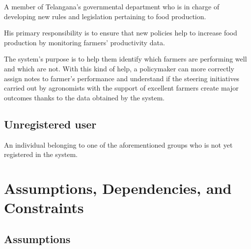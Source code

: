 A member of Telangana's governmental department who is in charge of developing new rules and legislation pertaining to food production.

His primary responsibility is to ensure that new policies help to increase food production by monitoring farmers' productivity data.

The system's purpose is to help them identify which farmers are performing well and which are not. With this kind of help, a policymaker can more correctly assign notes to farmer's performance and understand if the steering initiatives carried out by agronomists with the support of excellent farmers create major outcomes thanks to the data obtained by the system.

\subsection{Unregistered user}

An individual belonging to one of the aforementioned groups who is not yet registered in the system.

\section{Assumptions, Dependencies, and Constraints}

\subsection{Assumptions}

